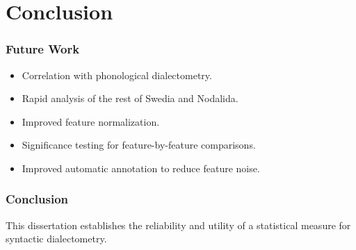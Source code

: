 \documentclass{beamer}
\begin{document}
\section{Conclusion}
\begin{frame}
  \frametitle{Future Work}
  \begin{itemize}
  \item Correlation with phonological dialectometry.
 \item Rapid analysis of the rest of Swedia and Nodalida.
 \item Improved feature normalization.
  \item Significance testing for feature-by-feature comparisons.
 \item Improved automatic annotation to reduce feature noise.
  \end{itemize}
\end{frame}
\begin{frame}
  \frametitle{Conclusion}
  This dissertation establishes the reliability and utility of a
  statistical measure for syntactic dialectometry.
\end{frame}
\end{document}
